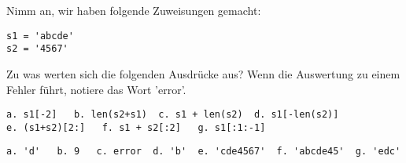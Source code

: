 \question[7]
Nimm an, wir haben folgende Zuweisungen gemacht:
\begin{lstlisting}
s1 = 'abcde'
s2 = '4567'
\end{lstlisting}
Zu was werten sich die folgenden Ausdrücke aus? Wenn die Auswertung zu einem Fehler führt, notiere das
Wort 'error'.

\begin{lstlisting}
a. s1[-2]   b. len(s2+s1)  c. s1 + len(s2)  d. s1[-len(s2)]
e. (s1+s2)[2:]   f. s1 + s2[:2]   g. s1[:1:-1]

\end{lstlisting}
\begin{solutionbox}{2cm}
\begin{lstlisting}
a. 'd'   b. 9   c. error  d. 'b'  e. 'cde4567'  f. 'abcde45'  g. 'edc'
\end{lstlisting}
\end{solutionbox}
